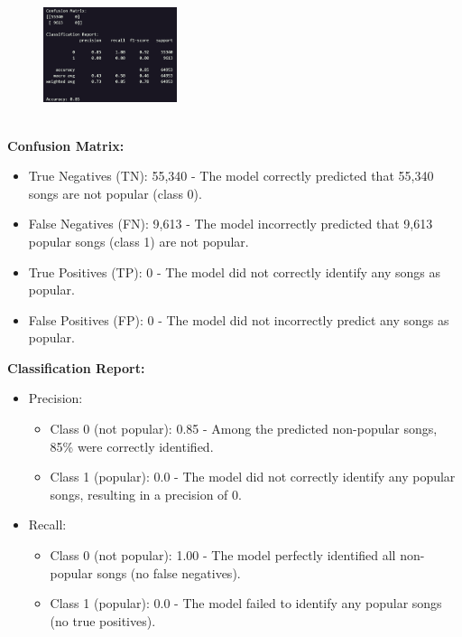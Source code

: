 \begin{itemize}
        \begin{figure}[h] 
            \centering 
            \includegraphics[width=0.35\textwidth]{media/logistic_reg_results.png} 
        \end{figure}
        \\
        \textbf{Confusion Matrix: }
        \begin{itemize}
            \item True Negatives (TN): 55,340 - The model correctly predicted that 55,340 songs are not popular (class 0).
            \item False Negatives (FN): 9,613 - The model incorrectly predicted that 9,613 popular songs (class 1) are not popular.
            \item True Positives (TP): 0 - The model did not correctly identify any songs as popular.
            \item False Positives (FP): 0 - The model did not incorrectly predict any songs as popular.
        \end{itemize}
        
        \textbf{Classification Report: }
        \begin{itemize}
            \item Precision: 
                \begin{itemize}
                    \item Class 0 (not popular): 0.85 - Among the predicted non-popular songs, 85\% were correctly identified.
                    \item Class 1 (popular): 0.0 - The model did not correctly identify any popular songs, resulting in a precision of 0.
                \end{itemize}
            \item Recall:
                \begin{itemize}
                    \item Class 0 (not popular): 1.00 - The model perfectly identified all non-popular songs (no false negatives).
                    \item Class 1 (popular): 0.0 - The model failed to identify any popular songs (no true positives).


\end{itemize}
\end{itemize}
\end{itemize}
